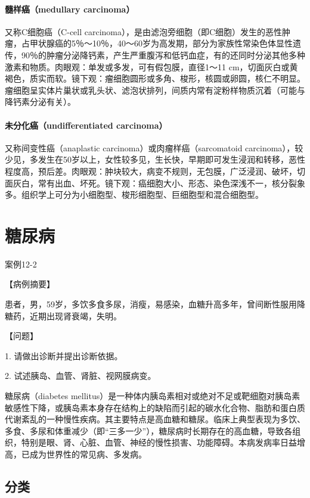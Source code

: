 \paragraph{髓样癌（medullary carcinoma）}
又称C细胞癌（C-cell
carcinoma），是由滤泡旁细胞（即C细胞）发生的恶性肿瘤，占甲状腺癌的5％～10％，40～60岁为高发期，部分为家族性常染色体显性遗传，90％的肿瘤分泌降钙素，产生严重腹泻和低钙血症，有的还同时分泌其他多种激素和物质。肉眼观：单发或多发，可有假包膜，直径1～11
cm，切面灰白或黄褐色，质实而软。镜下观：瘤细胞圆形或多角、梭形，核圆或卵圆，核仁不明显。瘤细胞呈实体片巢状或乳头状、滤泡状排列，间质内常有淀粉样物质沉着（可能与降钙素分泌有关）。

\paragraph{未分化癌（undifferentiated carcinoma）}
又称间变性癌（anaplastic
carcinoma）或肉瘤样癌（sarcomatoid
carcinoma），较少见，多发生在50岁以上，女性较多见，生长快，早期即可发生浸润和转移，恶性程度高，预后差。肉眼观：肿块较大，病变不规则，无包膜，广泛浸润、破坏，切面灰白，常有出血、坏死。镜下观：癌细胞大小、形态、染色深浅不一，核分裂象多。组织学上可分为小细胞型、梭形细胞型、巨细胞型和混合细胞型。

\section{糖尿病}

\begin{framed}
{案例12-2}

{【病例摘要】}

患者，男，59岁，多饮多食多尿，消瘦，易感染，血糖升高多年，曾间断性服用降糖药，近期出现肾衰竭，失明。

{【问题】}

1. 请做出诊断并提出诊断依据。

2. 试述胰岛、血管、肾脏、视网膜病变。
\end{framed}

糖尿病（diabetes
mellitus）是一种体内胰岛素相对或绝对不足或靶细胞对胰岛素敏感性下降，或胰岛素本身存在结构上的缺陷而引起的碳水化合物、脂肪和蛋白质代谢紊乱的一种慢性疾病。其主要特点是高血糖和糖尿。临床上典型表现为多饮、多食、多尿和体重减少（即“三多一少”），糖尿病时长期存在的高血糖，导致各组织，特别是眼、肾、心脏、血管、神经的慢性损害、功能障碍。本病发病率日益增高，已成为世界性的常见病、多发病。

\subsection{分类}

